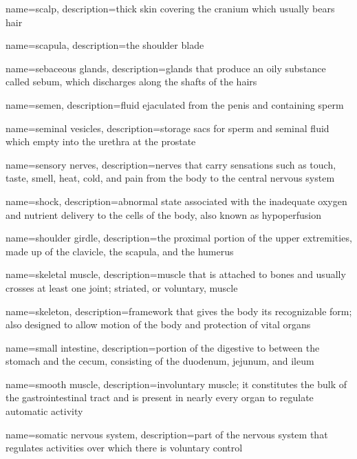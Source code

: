\documentclass[../../EMT-169.tex]{subfiles}
\begin{document}
	{
		name=scalp,
		description={thick skin covering the cranium which usually bears hair}
	}
	
	{
		name=scapula,
		description={the shoulder blade}
	}
	
	{
		name=sebaceous glands,
		description={glands that produce an oily substance called sebum, which discharges along the shafts of the hairs}
	}
	
	{
		name=semen,
		description={fluid ejaculated from the penis and containing sperm}
	}
	
	{
		name=seminal vesicles,
		description={storage sacs for sperm and seminal fluid which empty into the urethra at the prostate}
	}
	
	{
		name=sensory nerves,
		description={nerves that carry sensations such as  touch, taste, smell, heat, cold, and pain from the body to the central nervous system}
	}
	
	{
		name=shock,
		description={abnormal state associated with the inadequate oxygen and nutrient delivery to the cells of the body, also known as hypoperfusion}
	}
	
	{
		name=shoulder girdle,
		description={the proximal portion of the upper extremities, made up of the clavicle, the scapula, and the humerus}
	}
	
	{
		name=skeletal muscle,
		description={muscle that is attached to bones and usually crosses at least one joint; striated, or voluntary, muscle}
	}
	
	{
		name=skeleton,
		description={framework that gives the body its recognizable form; also designed to allow motion of the body and protection of vital organs}
	}
	
	{
		name=small intestine,
		description={portion of the digestive to between the stomach and the cecum, consisting of the duodenum, jejunum, and ileum}
	}
	
	{
		name=smooth muscle,
		description={involuntary muscle; it constitutes the bulk of the gastrointestinal tract and is present in nearly every organ to regulate automatic activity}
	}
	
	{
		name=somatic nervous system,
		description={part of the nervous system that regulates activities over which there is voluntary control}
	}
	
\end{document}
